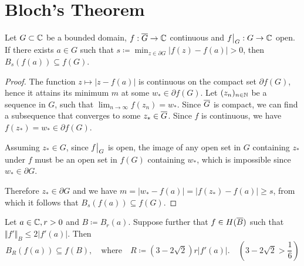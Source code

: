 \section{Bloch's Theorem}
\label{sec:blochs-theorem}

\begin{lemma} \label{lem:bloch-lemma-1}
    Let $G \subset \mathbb{C}$ be a bounded domain, $f : \overline{G} \to \mathbb{C}$ continuous and $\restr{f}{G} : G \to \C$ open. If there exists $a \in G$ such that $s \coloneqq \min_{z \in \partial G} \vert f(z) - f(a) \vert > 0$, then $B_{s}(f(a)) \subseteq f(G)$.
\end{lemma}

\begin{proof}
    The function $z \mapsto \vert z - f(a) \vert$ is continuous on the compact set $\partial f(G)$, hence it attains its minimum $m$ at some $w_* \in \partial f(G)$. Let $(z_n)_{n \in \mathbb{N}}$ be a sequence in $G$, such that $\lim_{n \to \infty} f(z_n) = w_*$. Since $\overline{G}$ is compact, we can find a subsequence that converges to some $z_* \in \overline{G}$. Since $f$ is continuous, we have $f(z_*) = w_* \in \partial f(G)$.

    Assuming $z_* \in G$, since $\restr{f}{G}$ is open, the image of any open set in $G$ containing $z_*$ under $f$ must be an open set in $f(G)$ containing $w_*$, which is impossible since $w_* \in \partial G$.

    Therefore $z_* \in \partial G$ and we have $m = \vert w_* - f(a) \vert = \vert f(z_*) - f(a) \vert \geq s$, from which it follows that $B_{s}(f(a)) \subseteq f(G)$.
\end{proof}

\begin{lemma} \label{lem:bloch-lemma-2}
    Let $a \in \mathbb{C}, r > 0$ and $B \coloneqq B_{r}(a)$. Suppose further that $f \in H(\overline{B})$ such that $\Vert f' \Vert_B \leq 2 \vert f'(a) \vert$. Then
    $$ B_{R}(f(a)) \subseteq f(B), \quad \textrm{where} \quad R \coloneqq (3 - 2 \sqrt{2}) r \vert f'(a) \vert. \quad (3 - 2 \sqrt{2} > {\textstyle\frac{1}{6}}) $$
\end{lemma}

